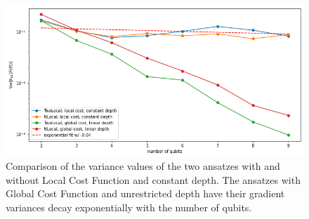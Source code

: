 \begin{figure}
    \includegraphics[width=\textwidth]{Artefact/Appendices/variancesLCF.png}
    \caption{
        Comparison of the variance values of the two ansatzes with and without Local Cost Function and constant depth.
        The ansatzes with Global Cost Function and unrestricted depth have their gradient variances decay exponentially with the number of qubits.
    }
    \label{Plot variance default and Local Cost}
\end{figure}
